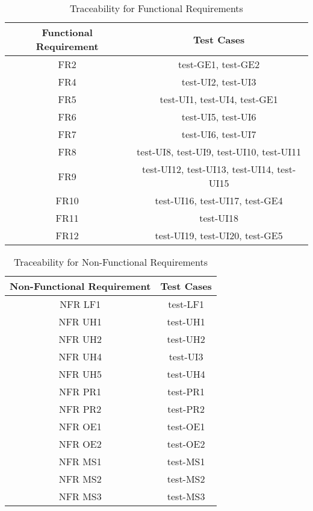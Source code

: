 \documentclass[12pt, titlepage]{article}
\begin{document}
\begin{table}[H]
  \begin{center}
    \caption{Traceability for Functional Requirements}
    \label{tab:table1}
    \begin{tabular}{c|c} 
        \toprule
        \textbf{Functional Requirement} & \textbf{Test Cases}\\
        \midrule
        FR2 & test-GE1, test-GE2\\
        \hline
        FR4 & test-UI2, test-UI3\\
        \hline
        FR5 & test-UI1, test-UI4, test-GE1\\
        \hline
        FR6 & test-UI5, test-UI6\\
        \hline
        FR7 & test-UI6, test-UI7\\
        \hline
        FR8 & test-UI8, test-UI9, test-UI10, test-UI11\\
        \hline
        FR9 &  test-UI12, test-UI13, test-UI14, test-UI15\\
        \hline
        FR10 & test-UI16, test-UI17, test-GE4\\
        \hline
        FR11 & test-UI18\\
        \hline
        FR12 & test-UI19, test-UI20, test-GE5\\
        \bottomrule
    \end{tabular}
  \end{center}
\end{table}

\begin{table}[H]
  \begin{center}
    \caption{Traceability for Non-Functional Requirements}
    \label{tab:table1}
    \begin{tabular}{c|c} 
        \toprule
        \textbf{Non-Functional Requirement} & \textbf{Test Cases}\\
        \midrule
        NFR LF1 & test-LF1 \\
        \hline
        NFR UH1 & test-UH1\\
        \hline
        NFR UH2 & test-UH2\\
        \hline
        NFR UH4 & test-UI3\\
        \hline
        NFR UH5 & test-UH4\\
        \hline
        NFR PR1 & test-PR1\\
        \hline
        NFR PR2 & test-PR2\\
        \hline
        NFR OE1 & test-OE1 \\
        \hline
        NFR OE2 & test-OE2 \\
        \hline
        NFR MS1 & test-MS1\\
        \hline
        NFR MS2 & test-MS2\\
        \hline
        NFR MS3 & test-MS3 \\
        \bottomrule
    \end{tabular}
  \end{center}
\end{table}
		
\end{document}
